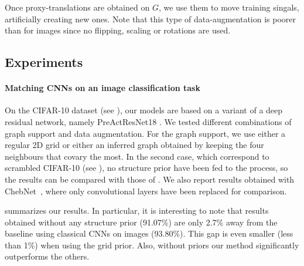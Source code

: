 Once proxy-translations are obtained on $G$, we use them to move training singals, artificially creating new ones. Note that this type of data-augmentation is poorer than for images since no flipping, scaling or rotations are used.

\subsection{Experiments}
\paragraph{Matching CNNs on an image classification task}

On the CIFAR-10 dataset (see ), our models are based on a variant of a deep residual network, namely PreActResNet18 \citep{he2016identity}. We tested different combinations of graph support and data augmentation. For the graph support, we use either a regular 2D grid or either an inferred graph obtained by keeping the four neighbours that covary the most. In the second case, which correspond to scrambled CIFAR-10 (see ), no structure prior have been fed to the process, so the results can be compared with those of \cite{lin2015}. We also report results obtained with ChebNet~\citep{defferrard2016convolutional}, where only convolutional layers have been replaced for comparison.

 summarizes our results. In particular, it is interesting to note that results obtained without any structure prior (91.07\%) are only 2.7\% away from the baseline using classical CNNs on images (93.80\%). This gap is even smaller (less than 1\%) when using the grid prior. Also, without priors our method significantly outperforms the others. %

